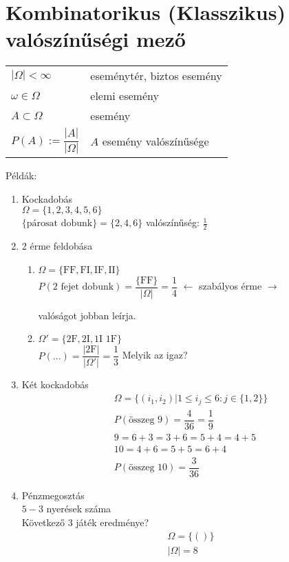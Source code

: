 \section{Kombinatorikus (Klasszikus) valószínűségi mező}


\begin{tabular}{ll}
  $|\Omega| < \infty$             & eseménytér, biztos esemény \\
  $\omega\in\Omega$               & elemi esemény              \\
  $A\subset\Omega$                & esemény                    \\
  $P(A) := \dfrac{|A|}{|\Omega|}$ & $A$ esemény valószínűsége  \\
\end{tabular}

Példák:

\begin{enumerate}
\item
  Kockadobás\\
  $\Omega = \{1, 2, 3, 4, 5, 6\}$ \\
  $\{\text{párosat dobunk}\} = \{2, 4, 6\}$   valószínűség: $\frac12$

\item
  2 érme feldobása
  \begin{enumerate}
  \item $\Omega = \{ \mbox{FF}, \mbox{FI}, \mbox{IF}, \mbox{II} \}$ \\
    $P(\mbox{2 fejet dobunk}) = \dfrac{\{\mbox{FF}\}}{|\Omega|}=\dfrac14$ $\leftarrow$ szabályos érme $\to$ \parbox{40mm}{valóságot jobban leírja.}

  \item $\Omega' = \{\mbox{2F}, \mbox{2I}, \mbox{1I 1F}\}$ \\
    $P(...) = \dfrac{|\mbox{2F}|}{|\Omega'|}=\dfrac13$  Melyik az igaz?

  \end{enumerate}
\item
  Két kockadobás
  \begin{align*}
    & \Omega = \{(i_1, i_2) | 1 \le i_j \le 6 : j\in \{1, 2\}\} \\
    & P(\mbox{összeg 9}) = \dfrac{4}{36} = \dfrac19 \\
    & 9 = 6+3=3+6 = 5+4 = 4+5 \\
    & 10 = 4+6=5+5= 6+4\\
    & P(\mbox{összeg 10})=\dfrac3{36}
  \end{align*}

 \item Pénzmegosztás\\
  $5 - 3$  nyerések száma \\
  Következő $3$ játék eredménye?
  \begin{align*}
    & \Omega = \{()\} \\
    & |\Omega| = 8
  \end{align*}
\end{enumerate}
